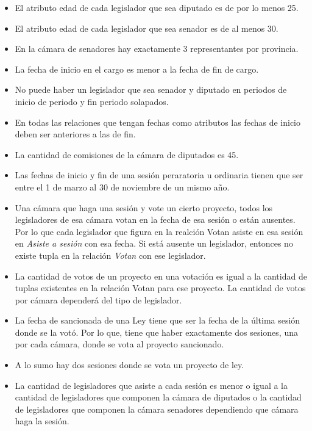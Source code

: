 \begin{itemize}
	\item El atributo edad de cada legislador que sea diputado es de por lo menos 25.
	\item El atributo edad de cada legislador que sea senador es de al menos 30.
	\item En la c\'amara de senadores hay exactamente 3 representantes por provincia.
	\item La fecha de inicio en el cargo es menor a la fecha de fin de cargo.
	\item No puede haber un legislador que sea senador y diputado en periodos de
	 inicio de periodo y fin periodo solapados.
	
	\item En todas las relaciones que tengan fechas como atributos las fechas de inicio
	 deben ser anteriores a las de fin.
	
	\item La cantidad de comisiones de la c\'amara de diputados es 45.
	
	\item Las fechas de inicio y fin de una sesi\'on peraratoria u ordinaria tienen que ser entre el 1 de marzo al 30 de noviembre de un mismo a\~no.
	
	\item Una c\'amara que haga una sesi\'on y vote un cierto proyecto, todos los legisladores de esa c\'amara votan en la fecha de esa sesi\'on o est\'an ausentes. Por lo que cada legislador que figura en la realci\'on Votan asiste en esa sesi\'on en \textit{Asiste a sesi\'on} con esa fecha. Si est\'a ausente un legislador, entonces no existe tupla en la relaci\'on \textit{Votan} con ese legislador.
	
	\item La cantidad de votos de un proyecto en una votaci\'on es igual a la cantidad de tuplas existentes en la relaci\'on Votan para ese proyecto. La cantidad de votos por c\'amara depender\'a del tipo de legislador.
	
	\item La fecha de sancionada de una Ley tiene que ser la fecha de la \'ultima sesi\'on donde se la vot\'o. Por lo que, tiene que haber exactamente dos sesiones, una por cada c\'amara, donde se vota al proyecto sancionado.
	
	\item A lo sumo hay dos sesiones donde se vota un proyecto de ley.
	
	\item La cantidad de legisladores que asiste a cada sesi\'on es menor o igual a la cantidad de legisladores que componen la c\'amara de diputados o la cantidad de legisladores que componen la c\'amara senadores dependiendo que c\'amara haga la sesi\'on.
	

\end{itemize}
